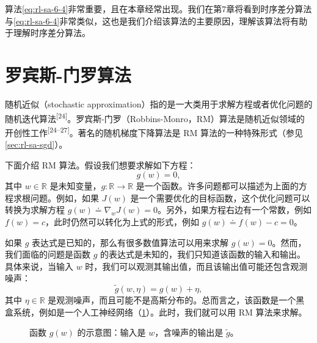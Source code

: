 算法\eqref{eq:rl-sa-6-4}非常重要，且在本章经常出现。我们在第7章将看到时序差分算法与\eqref{eq:rl-sa-6-4}非常类似，这也是我们介绍该算法的主要原因，理解该算法将有助于理解时序差分算法。

\section{罗宾斯-门罗算法}
\label{sec:rl-sa-rm}

随机近似（stochastic approximation）指的是一大类用于求解方程或者优化问题的随机迭代算法\textsuperscript{[24]}。罗宾斯-门罗（Robbins-Monro，RM）算法是随机近似领域的开创性工作\textsuperscript{[24--27]}。著名的随机梯度下降算法是 RM 算法的一种特殊形式（参见\cref{sec:rl-sa-sgd}）。

下面介绍 RM 算法。假设我们想要求解如下方程：
\begin{equation}
g(w) = 0,
\end{equation}
其中 $w \in \mathbb{R}$ 是未知变量，$g: \mathbb{R} \to \mathbb{R}$ 是一个函数。许多问题都可以描述为上面的方程求根问题。例如，如果 $J(w)$ 是一个需要优化的目标函数，这个优化问题可以转换为求解方程 $g(w) \doteq \nabla_w J(w) = 0$。另外，如果方程右边有一个常数，例如 $f(w) = c$，此时仍然可以转化为上式的形式，例如 $g(w) \doteq f(w) - c = 0$。

如果 $g$ 表达式是已知的，那么有很多数值算法可以用来求解 $g(w) = 0$。然而，我们面临的问题是函数 $g$ 的表达式是未知的，我们只知道该函数的输入和输出。具体来说，当输入 $w$ 时，我们可以观测其输出值，而且该输出值可能还包含观测噪声：
\begin{equation}
\tilde{g}(w, \eta) = g(w) + \eta,
\end{equation}
其中 $\eta \in \mathbb{R}$ 是观测噪声，而且可能不是高斯分布的。总而言之，该函数是一个黑盒系统，例如是一个人工神经网络（\cref{fig:rl-sa-blackbox}）。此时，我们就可以用 RM 算法来求解。

\begin{figure}[H]
\centering
{}
\caption{函数 $g(w)$ 的示意图：输入是 $w$，含噪声的输出是 $\tilde{g}$。}
\label{fig:rl-sa-blackbox}
\end{figure}

